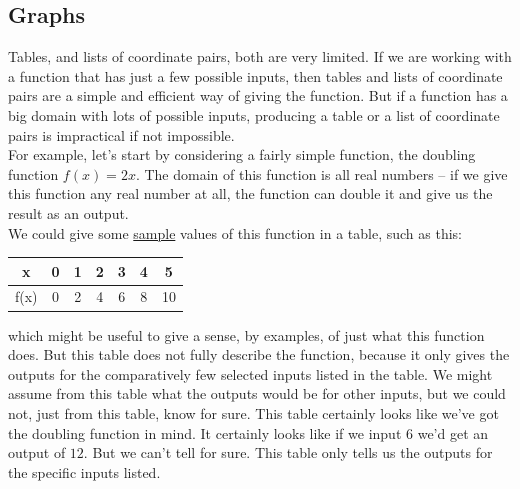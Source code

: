 



%
%

\subsection{Graphs}

Tables, and lists of coordinate pairs, both are very limited. If we are working with a function that has just a few possible inputs, then tables and lists of coordinate pairs are a simple and efficient way of giving the function. But if a function has a big domain with lots of possible inputs, producing a table or a list of coordinate pairs is impractical if not impossible.\\

For example, let’s start by considering a fairly simple function, the doubling function $f(x)=2x$.  The domain of this function is all real numbers – if we give this function any real number at all, the function can double it and give us the result as an output.\\

We could give some \underline{sample} values of this function in a table, such as this:

\begin{center}
	\begin{tabular}{c|c|c|c|c|c|c}
		x & 0 & 1 & 2 & 3 & 4 & 5 \\
		\hline
		f(x) & 0 & 2 & 4 & 6 & 8 & 10	
	\end{tabular}
\end{center}

which might be useful to give a sense, by examples, of just what this function does. But this table does not fully describe the function, because it only gives the outputs for the comparatively few selected inputs listed in the table. We might assume from this table what the outputs would be for other inputs, but we could not, just from this table, know for sure. This table certainly looks like we’ve got the doubling function in mind. It certainly looks like if we input $6$ we’d get an output of $12$. But we can’t tell for sure. This table only tells us the outputs for the specific inputs listed.\\

